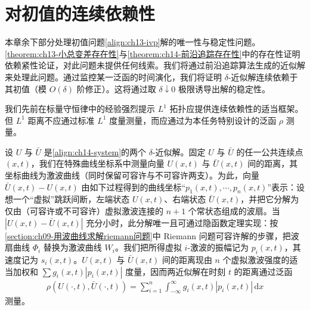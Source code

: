 \documentclass[../../main.tex]{subfiles}
\begin{document}
\section{对初值的连续依赖性}\label{section:ch14-连续依赖性}

本章余下部分处理初值问题\eqref{align:ch13-ivp}解的唯一性与稳定性问题。\cref{theorem:ch13-小总变差存在性}与\cref{theorem:ch14-前沿追踪存在性}中的存在性证明依赖紧性论证，对此问题未提供任何线索。我们将通过前沿追踪算法生成的近似解来处理此问题。通过监控某一泛函的时间演化，我们将证明 $\delta$-近似解连续依赖于其初值（模 $O(\delta)$ 阶修正）。这将通过取 $\delta\downarrow0$ 极限诱导出解的稳定性。



我们先前在标量守恒律中的经验强烈提示 $L^1$ 拓扑应提供连续依赖性的适当框架。但 $L^1$ 距离不应通过标准 $L^1$ 度量测量，而应通过为本任务特别设计的泛函 $\rho$ 测量。

设 $U$ 与 $\bar U$ 是\eqref{align:ch14-system}的两个 $\delta$-近似解。固定 $U$ 与 $\bar U$ 的任一公共连续点 $(x,t)$，我们在特殊曲线坐标系中测量向量 $U(x,t)$ 与 $\bar U(x,t)$ 间的距离，其坐标曲线为激波曲线（同时保留可容许与不可容许两支）。为此，向量 $\bar U(x,t)-U(x,t)$ 由如下过程得到的曲线坐标``$p_1(x,t),\cdots,p_n(x,t)$''表示：设想一个``虚拟''跳跃间断，左端状态 $U(x,t)$、右端状态 $\bar U(x,t)$，并把它分解为仅由（可容许或不可容许）虚拟激波连接的 $n+1$ 个常状态组成的波扇。当 $|U(x,t)-\bar U(x,t)|$ 充分小时，此分解唯一且可通过隐函数定理实现：按\cref{section:ch09-用波曲线求解riemann问题}中 Riemann 问题可容许解的步骤，把波扇曲线 $\Phi_i$ 替换为激波曲线 $W_i$。我们把所得虚拟 $i$-激波的振幅记为 $p_i(x,t)$，其速度记为 $s_i(x,t)$。$U(x,t)$ 与 $\bar U(x,t)$ 间的距离现由 $n$ 个虚拟激波强度的适当加权和 $\sum g_i(x,t)|p_i(x,t)|$ 度量，因而两近似解在时刻 $t$ 的距离通过泛函
\begin{align}
\rho(U(\cdot,t),\bar U(\cdot,t))=\sum_{i=1}^n\int_{-\infty}^\infty g_i(x,t)|p_i(x,t)|\,\mathrm{d}x
\label{align:ch14-rho}
\end{align}
测量。
\end{document}
